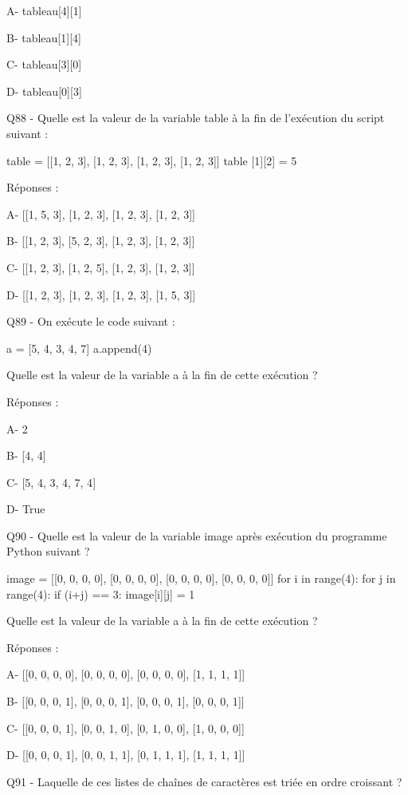 \documentclass[
]{book}
\begin{document}
A- tableau{[}4{]}{[}1{]}

B- tableau{[}1{]}{[}4{]}

C- tableau{[}3{]}{[}0{]}

D- tableau{[}0{]}{[}3{]}

Q88 - Quelle est la valeur de la variable table à la fin de l'exécution du script suivant :

table = {[}{[}1, 2, 3{]}, {[}1, 2, 3{]}, {[}1, 2, 3{]}, {[}1, 2, 3{]}{]}
table {[}1{]}{[}2{]} = 5

Réponses :

A- {[}{[}1, 5, 3{]}, {[}1, 2, 3{]}, {[}1, 2, 3{]}, {[}1, 2, 3{]}{]}

B- {[}{[}1, 2, 3{]}, {[}5, 2, 3{]}, {[}1, 2, 3{]}, {[}1, 2, 3{]}{]}

C- {[}{[}1, 2, 3{]}, {[}1, 2, 5{]}, {[}1, 2, 3{]}, {[}1, 2, 3{]}{]}

D- {[}{[}1, 2, 3{]}, {[}1, 2, 3{]}, {[}1, 2, 3{]}, {[}1, 5, 3{]}{]}

Q89 - On exécute le code suivant :

a = {[}5, 4, 3, 4, 7{]}
a.append(4)

Quelle est la valeur de la variable a à la fin de cette exécution ?

Réponses :

A- 2

B- {[}4, 4{]}

C- {[}5, 4, 3, 4, 7, 4{]}

D- True

Q90 - Quelle est la valeur de la variable image après exécution du programme Python suivant ?

image = {[}{[}0, 0, 0, 0{]}, {[}0, 0, 0, 0{]}, {[}0, 0, 0, 0{]}, {[}0, 0, 0, 0{]}{]}
for i in range(4):
for j in range(4):
if (i+j) == 3:
image{[}i{]}{[}j{]} = 1

Quelle est la valeur de la variable a à la fin de cette exécution ?

Réponses :

A- {[}{[}0, 0, 0, 0{]}, {[}0, 0, 0, 0{]}, {[}0, 0, 0, 0{]}, {[}1, 1, 1, 1{]}{]}

B- {[}{[}0, 0, 0, 1{]}, {[}0, 0, 0, 1{]}, {[}0, 0, 0, 1{]}, {[}0, 0, 0, 1{]}{]}

C- {[}{[}0, 0, 0, 1{]}, {[}0, 0, 1, 0{]}, {[}0, 1, 0, 0{]}, {[}1, 0, 0, 0{]}{]}

D- {[}{[}0, 0, 0, 1{]}, {[}0, 0, 1, 1{]}, {[}0, 1, 1, 1{]}, {[}1, 1, 1, 1{]}{]}

Q91 - Laquelle de ces listes de chaînes de caractères est triée en ordre croissant ?
\end{document}
